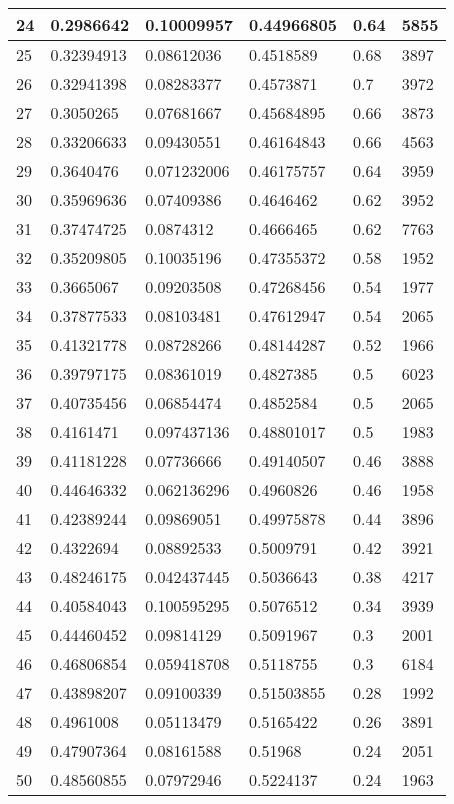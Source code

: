 \begin{longtable}{|l|l|l|l|l|l|}
24 & 0.2986642 & 0.10009957 & 0.44966805 & 0.64 & 5855 \\ \hline 
25 & 0.32394913 & 0.08612036 & 0.4518589 & 0.68 & 3897 \\ \hline 
26 & 0.32941398 & 0.08283377 & 0.4573871 & 0.7 & 3972 \\ \hline 
27 & 0.3050265 & 0.07681667 & 0.45684895 & 0.66 & 3873 \\ \hline 
28 & 0.33206633 & 0.09430551 & 0.46164843 & 0.66 & 4563 \\ \hline 
29 & 0.3640476 & 0.071232006 & 0.46175757 & 0.64 & 3959 \\ \hline 
30 & 0.35969636 & 0.07409386 & 0.4646462 & 0.62 & 3952 \\ \hline 
31 & 0.37474725 & 0.0874312 & 0.4666465 & 0.62 & 7763 \\ \hline 
32 & 0.35209805 & 0.10035196 & 0.47355372 & 0.58 & 1952 \\ \hline 
33 & 0.3665067 & 0.09203508 & 0.47268456 & 0.54 & 1977 \\ \hline 
34 & 0.37877533 & 0.08103481 & 0.47612947 & 0.54 & 2065 \\ \hline 
35 & 0.41321778 & 0.08728266 & 0.48144287 & 0.52 & 1966 \\ \hline 
36 & 0.39797175 & 0.08361019 & 0.4827385 & 0.5 & 6023 \\ \hline 
37 & 0.40735456 & 0.06854474 & 0.4852584 & 0.5 & 2065 \\ \hline 
38 & 0.4161471 & 0.097437136 & 0.48801017 & 0.5 & 1983 \\ \hline 
39 & 0.41181228 & 0.07736666 & 0.49140507 & 0.46 & 3888 \\ \hline 
40 & 0.44646332 & 0.062136296 & 0.4960826 & 0.46 & 1958 \\ \hline 
41 & 0.42389244 & 0.09869051 & 0.49975878 & 0.44 & 3896 \\ \hline 
42 & 0.4322694 & 0.08892533 & 0.5009791 & 0.42 & 3921 \\ \hline 
43 & 0.48246175 & 0.042437445 & 0.5036643 & 0.38 & 4217 \\ \hline 
44 & 0.40584043 & 0.100595295 & 0.5076512 & 0.34 & 3939 \\ \hline 
45 & 0.44460452 & 0.09814129 & 0.5091967 & 0.3 & 2001 \\ \hline 
46 & 0.46806854 & 0.059418708 & 0.5118755 & 0.3 & 6184 \\ \hline 
47 & 0.43898207 & 0.09100339 & 0.51503855 & 0.28 & 1992 \\ \hline 
48 & 0.4961008 & 0.05113479 & 0.5165422 & 0.26 & 3891 \\ \hline 
49 & 0.47907364 & 0.08161588 & 0.51968 & 0.24 & 2051 \\ \hline 
50 & 0.48560855 & 0.07972946 & 0.5224137 & 0.24 & 1963 \\ \hline 
\end{longtable}